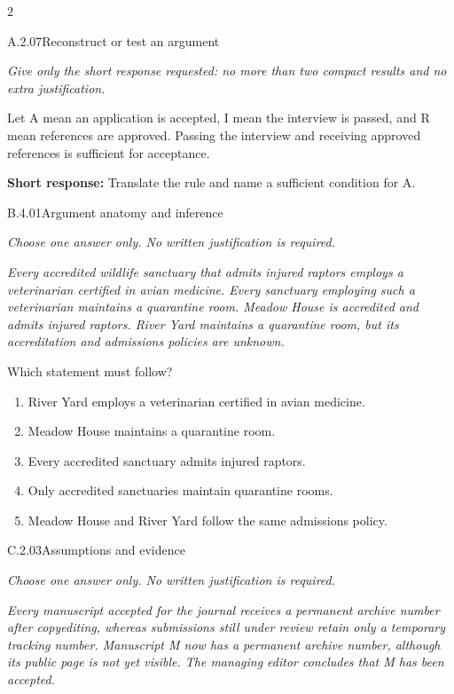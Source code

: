 \documentclass[9pt]{extarticle}
\newcommand{\choice}[1]{\item #1}
\begin{document}
\begin{multicols}{2}
\begin{DenseCoreProblem}{A.2.07}{Reconstruct or test an argument}
{\scriptsize\textit{Give only the short response requested: no more than two compact results and no extra justification.}\par}
Let A mean an application is accepted, I mean the interview is passed, and R mean references are approved. Passing the interview and receiving approved references is sufficient for acceptance.

\textbf{Short response:} Translate the rule and name a sufficient condition for A.
\end{DenseCoreProblem}
\begin{DenseCoreProblem}{B.4.01}{Argument anatomy and inference}
{\scriptsize\textit{Choose one answer only. No written justification is required.}\par}
\emph{Every accredited wildlife sanctuary that admits injured raptors employs a veterinarian certified in avian medicine. Every sanctuary employing such a veterinarian maintains a quarantine room. Meadow House is accredited and admits injured raptors. River Yard maintains a quarantine room, but its accreditation and admissions policies are unknown.}

Which statement must follow?
\begin{enumerate}[label=(\alph*)]
  \choice{River Yard employs a veterinarian certified in avian medicine.}
  \choice{Meadow House maintains a quarantine room.}
  \choice{Every accredited sanctuary admits injured raptors.}
  \choice{Only accredited sanctuaries maintain quarantine rooms.}
  \choice{Meadow House and River Yard follow the same admissions policy.}
\end{enumerate}
\end{DenseCoreProblem}
\columnbreak
\begin{DenseCoreProblem}{C.2.03}{Assumptions and evidence}
{\scriptsize\textit{Choose one answer only. No written justification is required.}\par}
\emph{Every manuscript accepted for the journal receives a permanent archive number after copyediting, whereas submissions still under review retain only a temporary tracking number. Manuscript M now has a permanent archive number, although its public page is not yet visible. The managing editor concludes that M has been accepted.}


\end{DenseCoreProblem}
\end{multicols}
\end{document}
